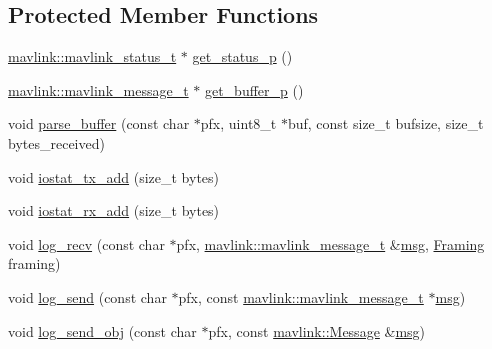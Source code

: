 \subsection*{Protected Member Functions}
\begin{DoxyCompactItemize}
\item 
\mbox{\hyperlink{include__v2_80_2mavlink__types_8h_aec6f7af3879252822d8fb108e97aafc2}{mavlink\+::mavlink\+\_\+status\+\_\+t}} $\ast$ \mbox{\hyperlink{group__mavconn_ga2bb422475644d340b8116f7d67253dde}{get\+\_\+status\+\_\+p}} ()
\item 
\mbox{\hyperlink{include__v0_89_2mavlink__types_8h_a63b963764c09dc72f4910c1521e325b9}{mavlink\+::mavlink\+\_\+message\+\_\+t}} $\ast$ \mbox{\hyperlink{group__mavconn_gae9521a7ebe812821fcd15a63f1c12b10}{get\+\_\+buffer\+\_\+p}} ()
\item 
void \mbox{\hyperlink{group__mavconn_ga5086c8460510e92da4e86fb266cb5a8b}{parse\+\_\+buffer}} (const char $\ast$pfx, uint8\+\_\+t $\ast$buf, const size\+\_\+t bufsize, size\+\_\+t bytes\+\_\+received)
\item 
void \mbox{\hyperlink{group__mavconn_gaabfc001375565bdafd47172374fcda0f}{iostat\+\_\+tx\+\_\+add}} (size\+\_\+t bytes)
\item 
void \mbox{\hyperlink{group__mavconn_gab045ff5b6e55b96630f00e131e4d2c16}{iostat\+\_\+rx\+\_\+add}} (size\+\_\+t bytes)
\item 
void \mbox{\hyperlink{group__mavconn_ga6edf345e262423905ecd6da2966d7b4f}{log\+\_\+recv}} (const char $\ast$pfx, \mbox{\hyperlink{include__v0_89_2mavlink__types_8h_a63b963764c09dc72f4910c1521e325b9}{mavlink\+::mavlink\+\_\+message\+\_\+t}} \&\mbox{\hyperlink{stratnode_8cpp_a82cfe4ed9bc9e1b07c8bf209c324d85b}{msg}}, \mbox{\hyperlink{group__mavconn_gac93e6f8262bcc6008b4882ae6213f494}{Framing}} framing)
\item 
void \mbox{\hyperlink{group__mavconn_ga7a6bcc0b1c21c9016422e2c20b4b04d0}{log\+\_\+send}} (const char $\ast$pfx, const \mbox{\hyperlink{include__v0_89_2mavlink__types_8h_a63b963764c09dc72f4910c1521e325b9}{mavlink\+::mavlink\+\_\+message\+\_\+t}} $\ast$\mbox{\hyperlink{stratnode_8cpp_a82cfe4ed9bc9e1b07c8bf209c324d85b}{msg}})
\item 
void \mbox{\hyperlink{group__mavconn_ga52bf39da3102cf3376a801f5b0f647a5}{log\+\_\+send\+\_\+obj}} (const char $\ast$pfx, const \mbox{\hyperlink{structmavlink_1_1Message}{mavlink\+::\+Message}} \&\mbox{\hyperlink{stratnode_8cpp_a82cfe4ed9bc9e1b07c8bf209c324d85b}{msg}})
\end{DoxyCompactItemize}
